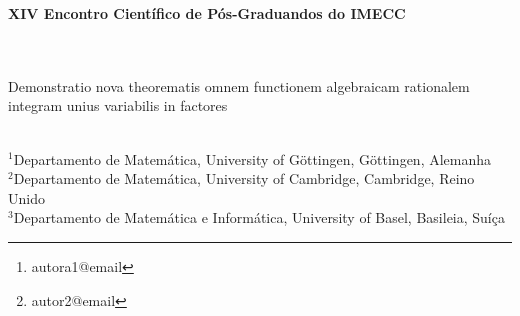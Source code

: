 \documentclass[a4paper, 12pt]{article}
\begin{document}
	\begin{center}
		\sc\large\textbf{XIV Encontro Científico de Pós-Graduandos do IMECC}\\
		\vspace{-1em}
		\noindent \hrulefill\\	
		\vspace{-1.1em}
		\noindent \hrulefill\\
	\end{center}
	\begin{center}
		\Large{Demonstratio nova theorematis omnem functionem algebraicam rationalem integram unius variabilis in factores}
	\end{center}
	\author{
		{\large  Nome da Autora }\thanks{autora1@email}\\
		{\small Filiação da autora} \\
		{\large Nome do Autor }\thanks{autor2@email} \\
		{\small Filiação do autor } \\
	}
	
	\\
	{\footnotesize
	$^{1}$Departamento de Matemática, University of G\"{o}ttingen, G\"{o}ttingen, Alemanha\\ 
	$^{2}$Departamento de Matemática, University of Cambridge, Cambridge, Reino Unido\\
	$^{3}$Departamento de Matemática e Informática, University of Basel, Basileia, Suíça}
	\begin{abstract}
	\lipsum[1]
	
	:   %
	\end{abstract}
\end{document}
